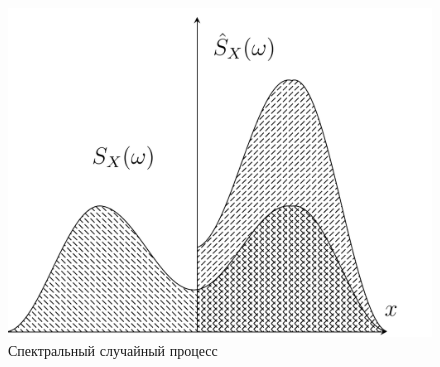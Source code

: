 \documentclass[russian, 12pt, fleqn,x11names]{article}
\begin{document}
\begin{figure}[h!]
\includegraphics[scale = 0.3]{Drawed.png}
\caption{Спектральный случайный процесс}
\end{figure}
\\
\iffalse
\end{document}
